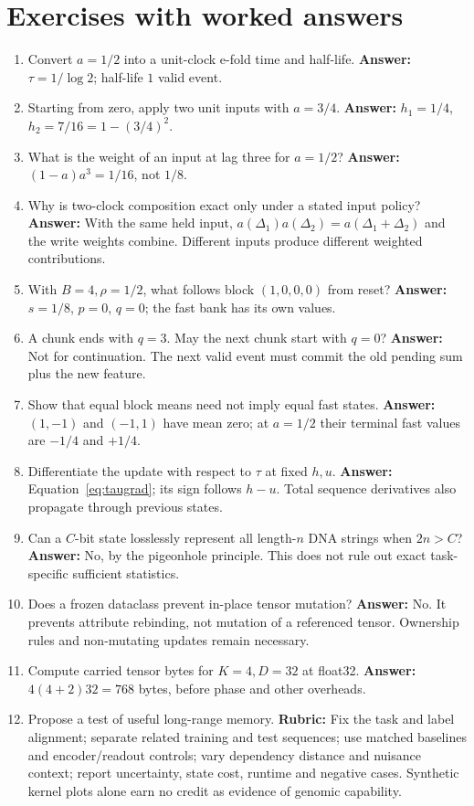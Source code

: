 \section{Exercises with worked answers}
\begin{enumerate}
\item Convert $a=1/2$ into a unit-clock e-fold time and half-life.
\textbf{Answer:} $\tau=1/\log2$; half-life $1$ valid event.
\item Starting from zero, apply two unit inputs with $a=3/4$.
\textbf{Answer:} $h_1=1/4$, $h_2=7/16=1-(3/4)^2$.
\item What is the weight of an input at lag three for $a=1/2$?
\textbf{Answer:} $(1-a)a^3=1/16$, not $1/8$.
\item Why is two-clock composition exact only under a stated input policy?
\textbf{Answer:} With the same held input,
$a(\Delta_1)a(\Delta_2)=a(\Delta_1+\Delta_2)$ and the write weights combine.
Different inputs produce different weighted contributions.
\item With $B=4,\rho=1/2$, what follows block $(1,0,0,0)$ from reset?
\textbf{Answer:} $s=1/8$, $p=0$, $q=0$; the fast bank has its own values.
\item A chunk ends with $q=3$. May the next chunk start with $q=0$?
\textbf{Answer:} Not for continuation. The next valid event must commit the
old pending sum plus the new feature.
\item Show that equal block means need not imply equal fast states.
\textbf{Answer:} $(1,-1)$ and $(-1,1)$ have mean zero; at $a=1/2$ their
terminal fast values are $-1/4$ and $+1/4$.
\item Differentiate the update with respect to $\tau$ at fixed $h,u$.
\textbf{Answer:} Equation~\ref{eq:taugrad}; its sign follows $h-u$.
Total sequence derivatives also propagate through previous states.
\item Can a $C$-bit state losslessly represent all length-$n$ DNA strings
when $2n>C$? \textbf{Answer:} No, by the pigeonhole principle.
This does not rule out exact task-specific sufficient statistics.
\item Does a frozen dataclass prevent in-place tensor mutation?
\textbf{Answer:} No. It prevents attribute rebinding, not mutation of a
referenced tensor. Ownership rules and non-mutating updates remain necessary.
\item Compute carried tensor bytes for $K=4,D=32$ at float32.
\textbf{Answer:} $4(4+2)32=768$ bytes, before phase and other overheads.
\item Propose a test of useful long-range memory.
\textbf{Rubric:} Fix the task and label alignment; separate related training
and test sequences; use matched baselines and encoder/readout controls;
vary dependency distance and nuisance context; report uncertainty, state
cost, runtime and negative cases. Synthetic kernel plots alone earn no
credit as evidence of genomic capability.
\end{enumerate}

